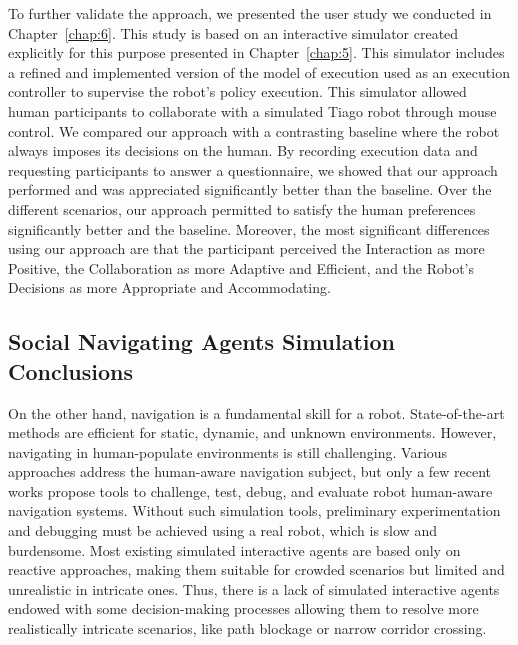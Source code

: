 To further validate the approach, we presented the user study we conducted in Chapter~\ref{chap:6}. This study is based on an interactive simulator created explicitly for this purpose presented in Chapter~\ref{chap:5}. This simulator includes a refined and implemented version of the model of execution used as an execution controller to supervise the robot's policy execution. This simulator allowed human participants to collaborate with a simulated Tiago robot through mouse control. We compared our approach with a contrasting baseline where the robot always imposes its decisions on the human. By recording execution data and requesting participants to answer a questionnaire, we showed that our approach performed and was appreciated significantly better than the baseline. Over the different scenarios, our approach permitted to satisfy the human preferences significantly better and the baseline. 
Moreover, the most significant differences using our approach are that the participant perceived the Interaction as more Positive, the Collaboration as more Adaptive and Efficient, and the Robot's Decisions as more Appropriate and Accommodating.    

\subsection*{Social Navigating Agents Simulation Conclusions}

On the other hand, navigation is a fundamental skill for a robot. State-of-the-art methods are efficient for static, dynamic, and unknown environments. However, navigating in human-populate environments is still challenging. Various approaches address the human-aware navigation subject, but only a few recent works propose tools to challenge, test, debug, and evaluate robot human-aware navigation systems. Without such simulation tools, preliminary experimentation and debugging must be achieved using a real robot, which is slow and burdensome. 
Most existing simulated interactive agents are based only on reactive approaches, making them suitable for crowded scenarios but limited and unrealistic in intricate ones. 
Thus, there is a lack of simulated interactive agents endowed with some decision-making processes allowing them to resolve more realistically intricate scenarios, like path blockage or narrow corridor crossing.


